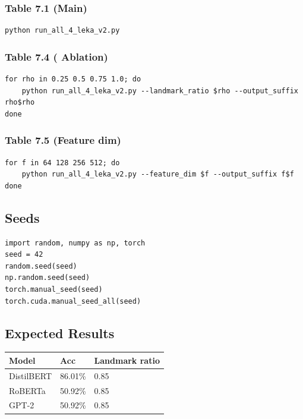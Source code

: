 \subsubsection{Table 7.1 (Main)}
\begin{lstlisting}
python run_all_4_leka_v2.py
\end{lstlisting}

\subsubsection{Table 7.4 (  Ablation)}
\begin{lstlisting}
for rho in 0.25 0.5 0.75 1.0; do
    python run_all_4_leka_v2.py --landmark_ratio $rho --output_suffix rho$rho
done
\end{lstlisting}

\subsubsection{Table 7.5 (Feature dim)}
\begin{lstlisting}
for f in 64 128 256 512; do
    python run_all_4_leka_v2.py --feature_dim $f --output_suffix f$f
done
\end{lstlisting}

\subsection{Seeds}

\begin{lstlisting}
import random, numpy as np, torch
seed = 42
random.seed(seed)
np.random.seed(seed)
torch.manual_seed(seed)
torch.cuda.manual_seed_all(seed)
\end{lstlisting}

\subsection{Expected Results}

\begin{table}[H]
\centering
\small
\begin{tabular}{lll}
\toprule
\textbf{Model} & \textbf{Acc} & \textbf{Landmark ratio} \\
\midrule
DistilBERT & 86.01\% & 0.85 \\
RoBERTa & 50.92\% & 0.85 \\
GPT-2 & 50.92\% & 0.85 \\
\bottomrule
\end{tabular}
\end{table}

